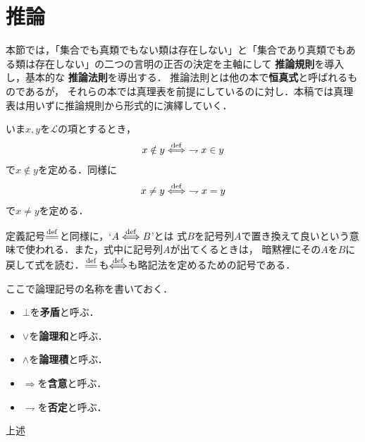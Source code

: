\section{推論}
	本節では，「集合でも真類でもない類は存在しない」と「集合であり真類でもある類は存在しない」の二つの言明の正否の決定を主軸にして
	{\bf 推論規則}を導入し，基本的な
	{\bf 推論法則}を導出する．
	推論法則とは他の本で{\bf 恒真式}と呼ばれるものであるが，
	それらの本では真理表を前提にしているのに対し．本稿では真理表は用いずに推論規則から形式的に演繹していく．
	
	いま$x,y$を$\mathcal{L}$の項とするとき，
	\begin{align}
		x \notin y \overset{\mathrm{def}}{\Longleftrightarrow}\ \rightharpoondown x \in y
	\end{align}
	で$x \notin y$を定める．同様に
	\begin{align}
		x \neq y \overset{\mathrm{def}}{\Longleftrightarrow}\ \rightharpoondown x = y
	\end{align}
	で$x \neq y$を定める．
	
	定義記号$\defeq$と同様に，`$A \overset{\mathrm{def}}{\Longleftrightarrow} B$'とは
	式$B$を記号列$A$で置き換えて良いという意味で使われる．また，式中に記号列$A$が出てくるときは，
	暗黙裡にその$A$を$B$に戻して式を読む．$\defeq$も$\overset{\mathrm{def}}{\Longleftrightarrow}$も略記法を定めるための記号である．
	
	ここで論理記号の名称を書いておく．
	\begin{itemize}
		\item $\bot$を{\bf 矛盾}と呼ぶ．
		\item $\vee$を{\bf 論理和}と呼ぶ．
		\item $\wedge$を{\bf 論理積}と呼ぶ．
		\item $\Longrightarrow$を{\bf 含意}と呼ぶ．
		\item $\rightharpoondown$を{\bf 否定}と呼ぶ．
	\end{itemize}
	
	\begin{screen}
		\begin{logicalaxm}[基本的な推論規則]\label{logicalaxm:fundamental_rules_of_inference}
			上述
		\end{logicalaxm}
	\end{screen}
	
